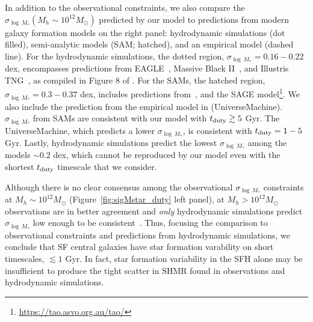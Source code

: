 \documentclass[12pt, letterpaper, preprint, tighten]{aastex62}
\begin{document}
In addition to the observational constraints, we also compare the $\sigma_{\log\,M_*}(M_h \sim 10^{12}M_\odot)$ 
predicted by our model to predictions from modern galaxy formation models 
on the right panel: hydrodynamic simulations (dot filled), semi-analytic models 
(SAM; hatched), and an empirical model (dashed line). For the hydrodynamic simulations, 
the dotted region, $\sigma_{\log\,M_*} = 0.16 - 0.22$ dex, encompasses 
predictions from EAGLE~\citep{mcalpine2016}, Massive Black II~\citep{khandai2015}, 
and Illustris TNG~\citep{pillepich2018}, as compiled in Figure 8 of \cite{wechsler2018}. 
For the SAMs, the hatched region, $\sigma_{\log\,M_*} = 0.3 - 0.37$ dex,
includes predictions from~\cite{lu2014, somerville2012}, and the SAGE 
model\footnote{\url{https://tao.asvo.org.au/tao/}}. We also include the 
prediction from the empirical model in \cite{behroozi2018} ({\sc UniverseMachine}). 
$\sigma_{\log\,M_*}$ from SAMs are consistent with our model with 
$t_{\rm duty} \gtrsim 5$ Gyr. The {\sc UniverseMachine}, which predicts a 
lower $\sigma_{\log\,M_*}$, is consistent with $t_{\rm duty} = 1 - 5$ Gyr. 
Lastly, hydrodynamic simulations predict the lowest $\sigma_{\log\,M_*}$ among 
the models $\sim 0.2$ dex, which cannot be reproduced by our model even with the 
shortest $t_{\rm duty}$ timescale that we consider. 

Although there is no clear consensus among the observational 
$\sigma_{\log\,M_*}$ constraints at $M_h \sim 10^{12} M_\odot$ (Figure~\ref{fig:sigMstar_duty} left panel), 
at $M_h > 10^{12} M_\odot$ observations are in better agreement and 
{\em only} hydrodynamic simulations predict $\sigma_{\log\,M_*}$ low 
enough to be consistent~\citep{wechsler2018}. Thus, focusing the comparison 
to observational constraints and predictions from hydrodynamic simulations, 
we conclude that SF central galaxies have star formation varability on short 
timescales, $\lesssim 1$ Gyr. In fact, star formation variability in the SFH 
alone may be insufficient to produce the tight scatter in SHMR found in 
observations and hydrodynamic simulations. 

\end{document}
